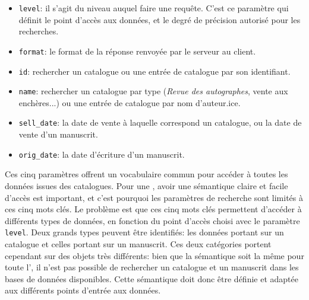 \begin{itemize}
	\item \texttt{level}: il s'agit du niveau auquel faire une requête. C'est ce paramètre qui définit le point d'accès aux données, et le degré de précision autorisé pour les recherches. 
	\item \texttt{format}: le format de la réponse renvoyée par le serveur au client.
	\item \texttt{id}: rechercher un catalogue ou une entrée de catalogue par son identifiant.
	\item \texttt{name}: rechercher un catalogue par type (\textit{Revue des autographes}, vente aux enchères...) ou une entrée de catalogue par nom d'auteur.ice.
	\item \texttt{sell\_date}: la date de vente à laquelle correspond un catalogue, ou la date de vente d'un manuscrit.
	\item \texttt{orig\_date}: la date d'écriture d'un manuscrit.
\end{itemize}

Ces cinq paramètres offrent un vocabulaire commun pour accéder à toutes les données issues des catalogues. Pour une \api{}, avoir une sémantique claire et facile d'accès est important, et c'est pourquoi les paramètres de recherche sont limités à ces cinq mots clés. Le problème est que ces cinq mots clés permettent d'accéder à différents types de données, en fonction du point d'accès choisi avec le paramètre \texttt{level}. Deux grands types peuvent être identifiés: les données portant sur un catalogue et celles portant sur un manuscrit. Ces deux catégories portent cependant sur des objets très différents: bien que la sémantique soit la même pour toute l'\api{}, il n'est pas possible de rechercher un catalogue et un manuscrit dans les bases de données disponibles. Cette sémantique doit donc être définie et adaptée aux différents points d'entrée aux données.

